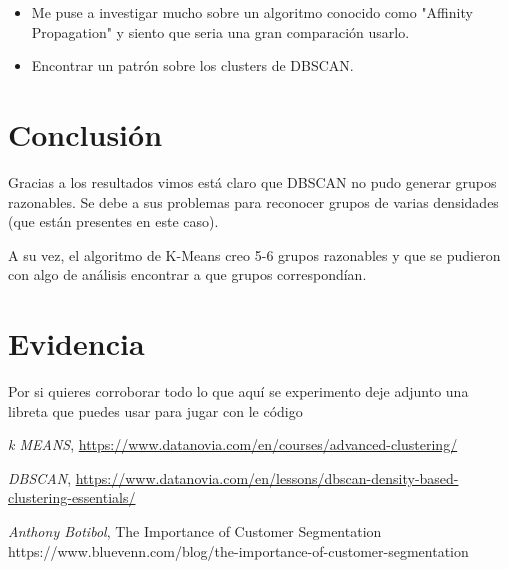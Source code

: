 \documentclass[12pt, fleqn]{report}                             %
\theoremstyle{break}                                            %
\begin{document}
        \begin{itemize}
            \item Me puse a investigar mucho sobre un algoritmo conocido como "Affinity Propagation" y siento que seria una gran comparación usarlo.
            \item Encontrar un patrón sobre los clusters de DBSCAN.
        \end{itemize}

    \section{Conclusión}

    Gracias a los resultados vimos está claro que DBSCAN no pudo generar grupos razonables.
    Se debe a sus problemas para reconocer grupos de varias densidades (que están presentes en este caso).
    
    A su vez, el algoritmo de K-Means creo 5-6 grupos razonables y que se pudieron con algo de análisis encontrar a que
    grupos correspondían.
    
    \section{Evidencia}
    
    Por si quieres corroborar todo lo que aquí se experimento deje adjunto una libreta que puedes usar para jugar con le código
    

\begin{thebibliography}{10}

      \textit{k MEANS}, 
      \url{https://www.datanovia.com/en/courses/advanced-clustering/}

      \textit{DBSCAN}, 
      \url{https://www.datanovia.com/en/lessons/dbscan-density-based-clustering-essentials/}

    \textit{Anthony Botibol}, 
    The Importance of Customer Segmentation\\
    https://www.bluevenn.com/blog/the-importance-of-customer-segmentation

\end{thebibliography}
\end{document}

